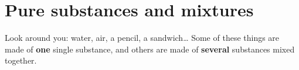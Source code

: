 %
%
%

\raggedbottom %

\section{Pure substances and mixtures}

Look around you: water, air, a pencil, a sandwich\ldots{} Some of these things are made of \textbf{one} single substance, and others are made of \textbf{several} substances mixed together.

